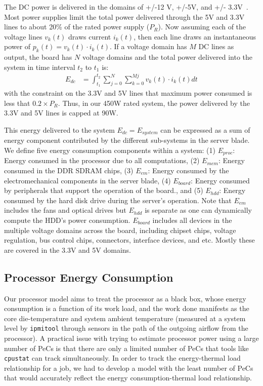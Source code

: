 \documentclass[times, 10pt, finalversion]{usetex-v1}
\begin{document}
The DC power is delivered in the domains of +/-12 V, +/-5V, and +/-
3.3V~\cite{SSI2004}. Most power supplies limit the total power delivered
through the 5V and 3.3V lines to about 20\% of the rated power supply
($P_R$). Now assuming each of the voltage lines $v_k(t)$ draws current
$i_k(t)$, then each line draws an instantaneous power of $p_k(t) =
v_k(t)\cdot i_k(t)$. If a voltage domain has $M$ DC lines as output, the
board has $N$ voltage domains and the total power delivered into the
system in time interval $t_2$ to $t_1$ is:
\begin{align}
\label{eq:energy_vtot}
E_{dc} & = \int_{t_1}^{t_2} \sum_{j=0}^{N} \sum_{k=0}^{Mj}
v_{k}(t)\cdot i_{k}(t) dt
\end{align}
with the constraint on the 3.3V and 5V lines that maximum power consumed
is less that $0.2\times P_R$.  Thus, in our 450W rated system, the power
delivered by the 3.3V and 5V lines is capped at 90W.

This energy delivered to the system $E_{dc} = E_{system}$ can be
expressed as a sum of energy component contributed by the different
sub-systems in the server blade.  We define five energy consumption
components within a system: (1) $E_{proc}$: Energy consumed in the
processor due to all computations, (2) $E_{mem}$: Energy consumed in the
DDR SDRAM chips, (3) $E_{em}$: Energy consumed by the electromechanical
components in the server blade, (4) $E_{board}$: Energy consumed by
peripherals that support the operation of the board., and (5) $E_{hdd}$:
Energy consumed by the hard disk drive during the server's
operation. Note that $E_{em}$ includes the fans and optical drives but
$E_{hdd}$ is separate as one can dynamically compute the
HDD's power consumption. $E_{board}$ includes all devices in the multiple
voltage domains across the board, including chipset chips, voltage
regulation, bus control chips, connectors, interface devices, and etc. Mostly
these are covered in the 3.3V and 5V domains.

\subsection{Processor Energy Consumption}
\label{sec:procmodel}
Our processor model aims to treat the processor as a black box,
whose energy consumption is a function of its work load, and the work
done manifests as the core die-temperature and system ambient
temperature (measured at a system level by \texttt{ipmitool} through
sensors in the path of the outgoing airflow from the processor).  A
practical issue with trying to estimate processor power using a large
number of PeCs is that there are only a limited number  of
PeCs that tools like \texttt{cpustat} can track simultaneously. In
order to track the energy-thermal load relationship for a job, we had to
develop a model with the least number of PeCs that would accurately
reflect the energy consumption-thermal load relationship.
\end{document}

